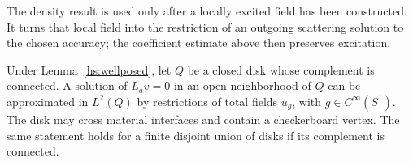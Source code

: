 The density result is used only after a locally excited field has been
constructed. It turns that local field into the restriction of an outgoing
scattering solution to the chosen accuracy; the coefficient estimate above
then preserves excitation.

\begin{lemma}
\label{hs:runge}
Under Lemma~\ref{hs:wellposed}, let $Q$ be a closed disk whose
complement is connected.  A solution of $L_av=0$ in an open
neighborhood of $Q$ can be approximated in $L^2(Q)$ by restrictions
of total fields $u_g$, with $g\in C^\infty(S^1)$.
The disk may cross material interfaces and contain a checkerboard
vertex.  The same statement holds for a finite disjoint union of
disks if its complement is connected.
\end{lemma}

